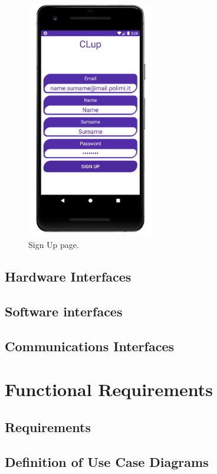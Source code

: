 \begin{figure}[h]
	\centering

	\includegraphics[width=0.5\textwidth]{images/sign_up.png}
	\caption{Sign Up page.}
	\label{customersUseCasesDiagram}
\end{figure}


\subsection{Hardware Interfaces}
\subsection{Software interfaces}
\subsection{Communications Interfaces}

\section{Functional Requirements}

\subsection{Requirements}

\subsection{Definition of Use Case Diagrams}

